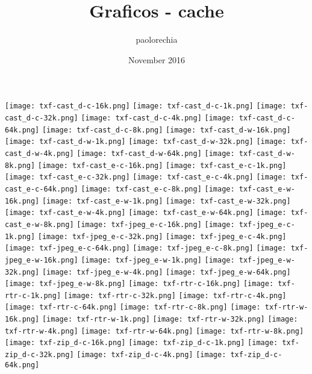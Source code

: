 \documentclass{article}
\title{Graficos - cache}
\author{paolorechia }
\date{November 2016}
\begin{document}
\setlength{\parindent}{0em}
\texttt{[image: txf-cast\_d-c-16k.png]}
\texttt{[image: txf-cast\_d-c-1k.png]}
\texttt{[image: txf-cast\_d-c-32k.png]}
\texttt{[image: txf-cast\_d-c-4k.png]}
\texttt{[image: txf-cast\_d-c-64k.png]}
\texttt{[image: txf-cast\_d-c-8k.png]}
\texttt{[image: txf-cast\_d-w-16k.png]}
\texttt{[image: txf-cast\_d-w-1k.png]}
\texttt{[image: txf-cast\_d-w-32k.png]}
\texttt{[image: txf-cast\_d-w-4k.png]}
\texttt{[image: txf-cast\_d-w-64k.png]}
\texttt{[image: txf-cast\_d-w-8k.png]}
\texttt{[image: txf-cast\_e-c-16k.png]}
\texttt{[image: txf-cast\_e-c-1k.png]}
\texttt{[image: txf-cast\_e-c-32k.png]}
\texttt{[image: txf-cast\_e-c-4k.png]}
\texttt{[image: txf-cast\_e-c-64k.png]}
\texttt{[image: txf-cast\_e-c-8k.png]}
\texttt{[image: txf-cast\_e-w-16k.png]}
\texttt{[image: txf-cast\_e-w-1k.png]}
\texttt{[image: txf-cast\_e-w-32k.png]}
\texttt{[image: txf-cast\_e-w-4k.png]}
\texttt{[image: txf-cast\_e-w-64k.png]}
\texttt{[image: txf-cast\_e-w-8k.png]}
\texttt{[image: txf-jpeg\_e-c-16k.png]}
\texttt{[image: txf-jpeg\_e-c-1k.png]}
\texttt{[image: txf-jpeg\_e-c-32k.png]}
\texttt{[image: txf-jpeg\_e-c-4k.png]}
\texttt{[image: txf-jpeg\_e-c-64k.png]}
\texttt{[image: txf-jpeg\_e-c-8k.png]}
\texttt{[image: txf-jpeg\_e-w-16k.png]}
\texttt{[image: txf-jpeg\_e-w-1k.png]}
\texttt{[image: txf-jpeg\_e-w-32k.png]}
\texttt{[image: txf-jpeg\_e-w-4k.png]}
\texttt{[image: txf-jpeg\_e-w-64k.png]}
\texttt{[image: txf-jpeg\_e-w-8k.png]}
\texttt{[image: txf-rtr-c-16k.png]}
\texttt{[image: txf-rtr-c-1k.png]}
\texttt{[image: txf-rtr-c-32k.png]}
\texttt{[image: txf-rtr-c-4k.png]}
\texttt{[image: txf-rtr-c-64k.png]}
\texttt{[image: txf-rtr-c-8k.png]}
\texttt{[image: txf-rtr-w-16k.png]}
\texttt{[image: txf-rtr-w-1k.png]}
\texttt{[image: txf-rtr-w-32k.png]}
\texttt{[image: txf-rtr-w-4k.png]}
\texttt{[image: txf-rtr-w-64k.png]}
\texttt{[image: txf-rtr-w-8k.png]}
\texttt{[image: txf-zip\_d-c-16k.png]}
\texttt{[image: txf-zip\_d-c-1k.png]}
\texttt{[image: txf-zip\_d-c-32k.png]}
\texttt{[image: txf-zip\_d-c-4k.png]}
\texttt{[image: txf-zip\_d-c-64k.png]}
\end{document}
